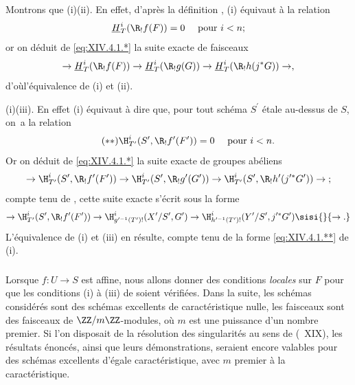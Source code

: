 Montrons que \textup{(i)}\SSI\textup{(ii)}. En effet, d'apr\`es la d\'efinition , \textup{(i)} \'equivaut \`a la relation
$$
\underline{H}_{T}^{i}(\R_{!}f(F))=0\quad\textrm{ pour }i<n\textrm{;}$$
or on d\'eduit de \eqref{eq:XIV.4.1.*} la suite exacte de faisceaux
$$
\to\underline{H}_{T}^{i}(\R_{!}f(F))\to\underline{H}_{T}^{i}(\R_{!}g(G))\to\underline{H}_{T}^{i}(\R_{!}h(j^{\ast}G))\to,
$$
d'o\`u\pageoriginale l'\'equivalence de \textup{(i)} et \textup{(ii)}.

\textup{(i)}\SSI\textup{(iii)}. En effet \textup{(i)} \'equivaut \`a dire que, pour tout sch\'ema $S^{\prime}$ \'etale au-dessus de $S$, on~a la relation
\begin{equation*} \label{eq:XIV.4.1.**} \tag{$**$} {\H_{T^{\prime}}^{i}(S^{\prime}, \R_{!}f^{\prime}(F^{\prime}))=0\quad\textrm{ pour }i<n.}
\end{equation*}
Or on d\'eduit de \eqref{eq:XIV.4.1.*} la suite exacte de groupes ab\'eliens
$$
\to\H_{T^{\prime}}^{i}(S^{\prime}, \R_{!}f^{\prime}(F^{\prime}))\to\H_{T^{\prime}}^{i}(S^{\prime}, \R_{!}g^{\prime}(G^{\prime}))\to \H_{T^{\prime}}^{i}(S^{\prime}, \R_{!}h^{\prime}(j^{\prime\ast}G^{\prime}))\to\;;$$
compte tenu de , cette suite exacte s'\'ecrit sous la forme
$$
\to\H_{T^{\prime}}^{i}(S^{\prime}, \R_{!}f^{\prime}(F^{\prime}))\to\H_{g^{\prime -1}(T^{\prime})!}^{i}(X^{\prime}/S^{\prime}, G^{\prime})\to\H_{h^{\prime -1}(T^{\prime})!}^{i}(Y^{\prime}/S^{\prime}, j^{\prime\ast}G^{\prime})\sisi{}{\to.}$$
L'\'equivalence de \textup{(i)} et \textup{(iii)} en r\'esulte, compte tenu de la forme \eqref{eq:XIV.4.1.**} de \textup{(i)}.

\setcounter{subsubsection}{-1} \setcounter{subsection}{2}

\subsubsection{} \label{XIV.4.2.0}
Lorsque $f\colon U\to S$ est affine, nous allons donner des conditions \emph{locales} sur $F$ pour que les conditions \textup{(i)} \`a \textup{(iii)} de  soient v\'erifi\'ees. Dans la suite, les sch\'emas consid\'er\'es sont des sch\'emas excellents de caract\'eristique nulle, les faisceaux sont des faisceaux de $\ZZ/m\ZZ$-modules, o\`u $m$ est une puissance d'un nombre premier. Si l'on disposait de la r\'esolution des singularit\'es au sens de (~XIX), les r\'esultats \'enonc\'es, ainsi que leurs d\'emonstrations, seraient encore valables pour des sch\'emas excellents d'\'egale caract\'eristique, avec $m$ premier \`a la caract\'eristique.


